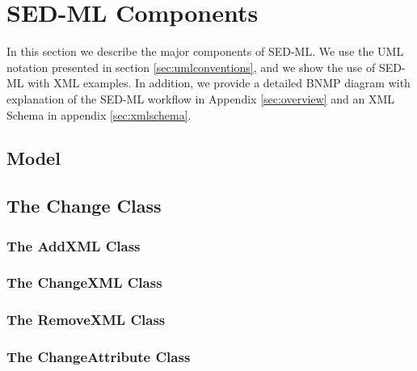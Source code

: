 
\section{SED-ML Components}
In this section we describe the major components of SED-ML. We use the UML notation presented in section \ref{sec:umlconventions}, and we show the use of SED-ML with XML examples. 
In addition, we provide a detailed BNMP diagram with explanation of the SED-ML workflow in Appendix \ref{sec:overview} and an XML Schema in appendix \ref{sec:xmlschema}. 

  \subsection{Model}
  

  \subsection[Change]{The Change Class}
  

  \subsubsection[AddXML]{The AddXML Class}
  

  \subsubsection[ChangeXML]{The ChangeXML Class}
  

	\subsubsection[RemoveXML]{The RemoveXML Class}
  

  \subsubsection[ChangeAttribute]{The ChangeAttribute Class}
  

